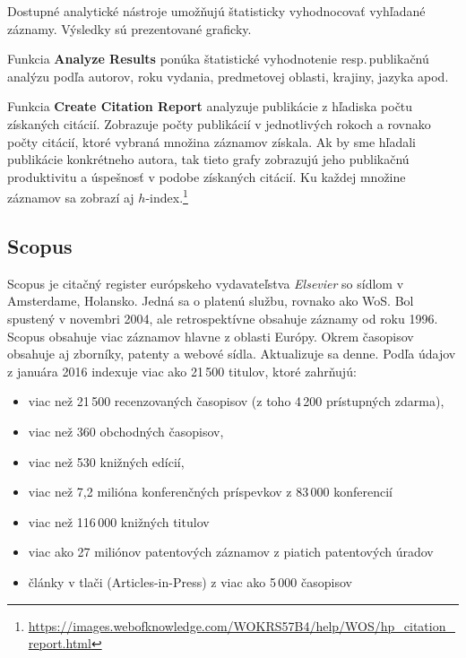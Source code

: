 Dostupné analytické nástroje umožňujú štatisticky vyhodnocovať vyhľadané
záznamy.  Výsledky sú prezentované graficky.

Funkcia \textbf{Analyze Results} ponúka štatistické vyhodnotenie
resp.\,publikačnú analýzu podľa autorov, roku vydania, predmetovej oblasti,
krajiny, jazyka apod.

Funkcia \textbf{Create Citation Report} analyzuje publikácie z hľadiska počtu
získaných citácií.  Zobrazuje počty publikácií v jednotlivých rokoch a rovnako
počty citácií, ktoré vybraná množina záznamov získala.  Ak by sme hľadali
publikácie konkrétneho autora, tak tieto grafy zobrazujú jeho publikačnú
produktivitu a úspešnosť v podobe získaných citácií.  Ku každej množine záznamov
sa zobrazí aj
$h$-index.\footnote{\url{https://images.webofknowledge.com/WOKRS57B4/help/WOS/hp_citation_report.html}}


\subsection{Scopus}

Scopus je citačný register európskeho vydavateľstva \emph{Elsevier} so sídlom v
Amsterdame, Holansko.  Jedná sa o platenú službu, rovnako ako WoS.  Bol spustený
v novembri 2004, ale retrospektívne obsahuje záznamy od roku 1996.  Scopus
obsahuje viac záznamov hlavne z oblasti Európy.  Okrem časopisov obsahuje aj
zborníky, patenty a webové sídla.  Aktualizuje sa denne.  Podľa údajov z januára
2016 indexuje viac ako 21\,500 titulov, ktoré zahrňujú:

\begin{itemize}

\item viac než 21\,500 recenzovaných časopisov (z toho 4\,200 prístupných
  zdarma),
 
\item viac než 360 obchodných časopisov,

\item viac než 530 knižných edícií,

\item viac než 7,2 milióna konferenčných príspevkov z 83\,000 konferencií

\item viac než 116\,000 knižných titulov 

\item viac ako 27 miliónov patentových záznamov z piatich patentových úradov

\item články v tlači (Articles-in-Press) z viac ako 5\,000 časopisov

\end{itemize}

